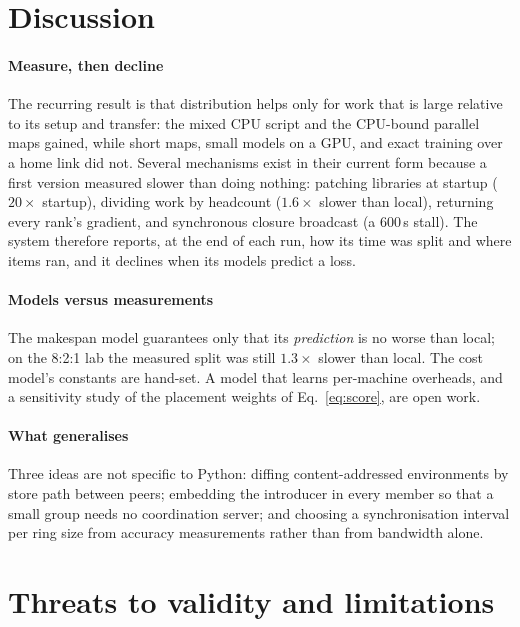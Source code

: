 \documentclass[5p,times,twocolumn]{elsarticle}
\begin{document}
\section{Discussion}
\label{sec:discussion}

\paragraph{Measure, then decline} The recurring result is that distribution
helps only for work that is large relative to its setup and transfer: the
mixed CPU script and the CPU-bound parallel maps gained, while short maps,
small models on a GPU, and exact training over a home link did not. Several
mechanisms exist in their current form because a first version measured slower
than doing nothing: patching libraries at startup ($20\times$ startup), dividing
work by headcount ($1.6\times$ slower than local), returning every rank's
gradient, and synchronous closure broadcast (a 600\,s stall). The system
therefore reports, at the end of each run, how its time was split and where
items ran, and it declines when its models predict a loss.

\paragraph{Models versus measurements} The makespan model guarantees only that
its \emph{prediction} is no worse than local; on the 8:2:1 lab the measured
split was still $1.3\times$ slower than local. The cost model's constants are
hand-set. A model that learns per-machine overheads, and a sensitivity study of
the placement weights of Eq.~\eqref{eq:score}, are open work.

\paragraph{What generalises} Three ideas are not specific to Python: diffing
content-addressed environments by store path between peers; embedding the
introducer in every member so that a small group needs no coordination server;
and choosing a synchronisation interval per ring size from accuracy
measurements rather than from bandwidth alone.

\section{Threats to validity and limitations}
\label{sec:threats}
\end{document}
